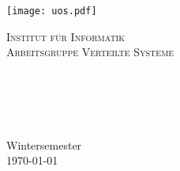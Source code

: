 %
%
%
%
%
%

\begin{titlepage}
	\centering
	\thispagestyle{empty}
	\begin{center}
	\texttt{[image: uos.pdf]}
	\end{center}
	\LARGE{\textsc{Institut für Informatik\\Arbeitsgruppe Verteilte Systeme}}
	\vfill
	\HRule\\[0.4cm]
	\LARGE{\emph{\mycourse}}\\
	\vspace{8mm}
	\huge{\textbf{{\selectfont
	\myMaintitle}}}\\
	\HRule\\[0.4cm]
	\vspace{9mm}
	\LARGE{\myName}\\
	\vspace{0.2cm}
	\normalsize{\myMatrikel}\\
	\vspace{4cm}
	\large{Wintersemester}\\
	\vspace{0.2cm}
	\large{\today}
	\vfill
	\end{titlepage}
	\newpage
